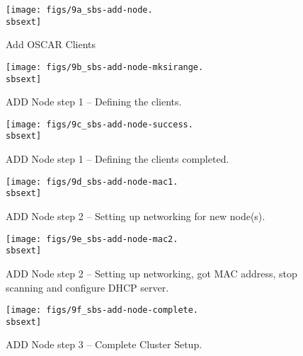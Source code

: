 
\begin{figure}[htbp]
  \begin{center}
    \texttt{[image: figs/9a\_sbs-add-node.\\sbsext]}
    \caption{Add OSCAR Clients}
    \label{fig:sbs-add-node1}
  \end{center}
\end{figure}


\begin{figure}[htbp]
  \begin{center}
    \texttt{[image: figs/9b\_sbs-add-node-mksirange.\\sbsext]}
    \caption{ADD Node step 1 -- Defining the clients.}
    \label{fig:sbs-add-node1-define-clients}
  \end{center}
\end{figure}

\begin{figure}[htbp]
  \begin{center}
    \texttt{[image: figs/9c\_sbs-add-node-success.\\sbsext]}
    \caption{ADD Node step 1 -- Defining the clients completed.}
    \label{fig:sbs-add-node1-define-clients2}
  \end{center}
\end{figure}


\begin{figure}[htbp]
  \begin{center}
    \texttt{[image: figs/9d\_sbs-add-node-mac1.\\sbsext]}
    \caption{ADD Node step 2 -- Setting up networking for new node(s).}
    \label{fig:sbs-add-node1-setup-network}
  \end{center}
\end{figure}

%
\begin{figure}[htbp]
  \begin{center}
    \texttt{[image: figs/9e\_sbs-add-node-mac2.\\sbsext]}
    \caption{ADD Node step 2 -- Setting up networking, got MAC address, stop scanning and configure DHCP server.}
    \label{fig:sbs-add-node1-setup-network2}
  \end{center}
\end{figure}

\clearpage

\begin{figure}[htbp]
  \begin{center}
    \texttt{[image: figs/9f\_sbs-add-node-complete.\\sbsext]}
    \caption{ADD Node step 3 -- Complete Cluster Setup.}
    \label{fig:sbs-add-node1-cluster-setup}
  \end{center}
\end{figure}

